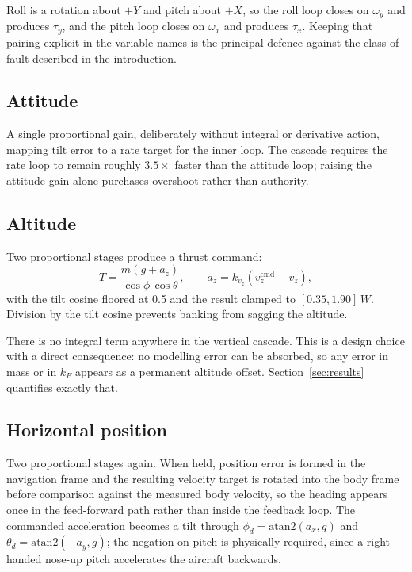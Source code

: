 \documentclass[conference]{IEEEtran}
\newcommand{\kF}{k_{F}}
\begin{document}
Roll is a rotation about $+Y$ and pitch about $+X$, so the roll loop closes on
$\omega_y$ and produces $\tau_y$, and the pitch loop closes on $\omega_x$ and
produces $\tau_x$. Keeping that pairing explicit in the variable names is the
principal defence against the class of fault described in the introduction.

\subsection{Attitude}

A single proportional gain, deliberately without integral or derivative
action, mapping tilt error to a rate target for the inner loop. The cascade
requires the rate loop to remain roughly $3.5\times$ faster than the attitude
loop; raising the attitude gain alone purchases overshoot rather than
authority.

\subsection{Altitude}

Two proportional stages produce a thrust command:
\begin{equation}
T = \frac{m\left(g + a_z\right)}{\cos\phi\,\cos\theta},
\qquad
a_z = k_{v_z}\!\left(v_z^{\text{cmd}} - v_z\right),
\end{equation}
with the tilt cosine floored at 0.5 and the result clamped to
$[0.35, 1.90]\,W$. Division by the tilt cosine prevents banking from sagging
the altitude.

There is no integral term anywhere in the vertical cascade. This is a design
choice with a direct consequence: no modelling error can be absorbed, so any
error in mass or in $\kF$ appears as a permanent altitude offset.
Section~\ref{sec:results} quantifies exactly that.

\subsection{Horizontal position}

Two proportional stages again. When held, position error is formed in the
navigation frame and the resulting velocity target is rotated into the body
frame before comparison against the measured body velocity, so the heading
appears once in the feed-forward path rather than inside the feedback loop.
The commanded acceleration becomes a tilt through
$\phi_d = \mathrm{atan2}(a_x, g)$ and
$\theta_d = \mathrm{atan2}(-a_y, g)$; the negation on pitch is physically
required, since a right-handed nose-up pitch accelerates the aircraft
backwards.
\end{document}
